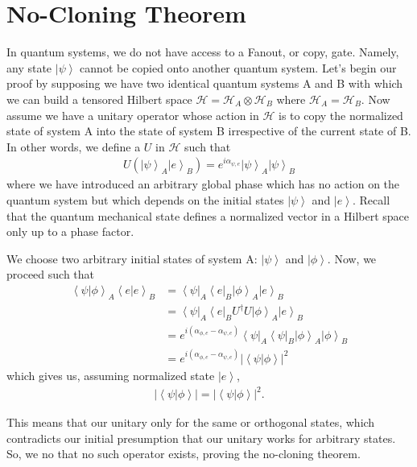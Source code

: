 \documentclass[11pt]{article} %
\newcommand{\bra}[1]{\left\langle #1 \right|}
\newcommand{\ket}[1]{\left|#1\right\rangle}
\newcommand{\braket}[2]{\left\langle#1 |  #2\right\rangle}
\begin{document}
\section{No-Cloning Theorem}
In quantum systems, we do not have access to a Fanout, or copy, gate. Namely, any state $\ket{\psi}$ cannot be copied onto another quantum system. Let's begin our proof by supposing we have two identical quantum systems A and B with which we can build a tensored Hilbert space $\mathcal{H}=\mathcal{H}_A\otimes\mathcal{H}_B$ where $\mathcal{H}_A=\mathcal{H}_B$. Now assume we have a unitary operator whose action in $\mathcal{H}$ is to copy the normalized state of system A into the state of system B irrespective of the current state of B. In other words, we define a $U$ in $\mathcal{H}$ such that
\begin{align}
    U(\ket{\psi}_A\ket{e}_B) = e^{i\alpha_{\psi,e}}\ket{\psi}_A\ket{\psi}_B
\end{align}
where we have introduced an arbitrary global phase which has no action on the quantum system but which depends on the initial states $\ket{\psi}$ and $\ket{e}$. Recall that the quantum mechanical state defines a normalized vector in a Hilbert space only up to a phase factor.

We choose two arbitrary initial states of system A: $\ket{\psi}$ and $\ket{\phi}$. Now, we proceed such that
\begin{align}
    \braket{\psi}{\phi}_A\braket{e}{e}_B &= \bra{\psi}_A\bra{e}_B\ket{\phi}_A\ket{e}_B\nonumber\\
    &= \bra{\psi}_A\bra{e}_BU^\dagger U\ket{\phi}_A\ket{e}_B\nonumber\\
    &= e^{i(\alpha_{\phi,e}-\alpha_{\psi,e})}\bra{\psi}_A\bra{\psi}_B\ket{\phi}_A\ket{\phi}_B\nonumber\\
    &= e^{i(\alpha_{\phi,e}-\alpha_{\psi,e})}\left|\braket{\psi}{\phi}\right|^2
\end{align}
which gives us, assuming normalized state $\ket{e}$,
\begin{align}
    \left|\braket{\psi}{\phi}\right| = \left|\braket{\psi}{\phi}\right|^2.
\end{align}

This means that our unitary only for the same or orthogonal states, which contradicts our initial presumption that our unitary works for arbitrary states. So, we no that no such operator exists, proving the no-cloning theorem.
\end{document}
